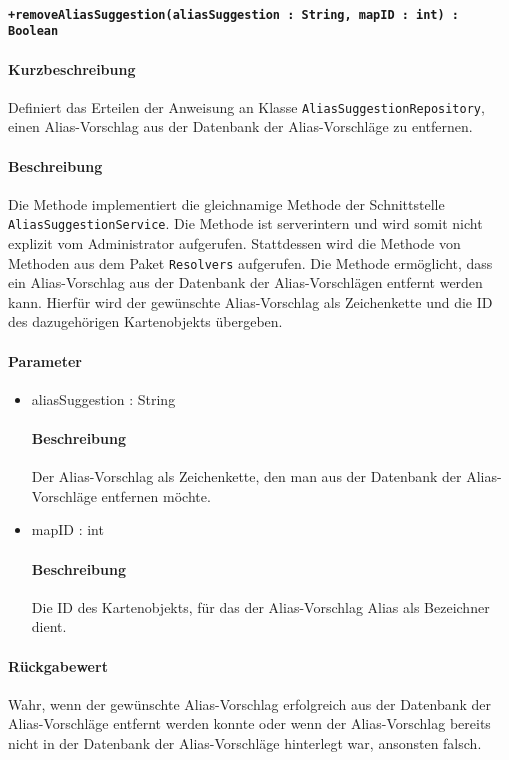 \paragraph*{\texttt{+removeAliasSuggestion(aliasSuggestion : String, mapID : int) : Boolean}}%
\paragraph*{Kurzbeschreibung}
Definiert das Erteilen der Anweisung an Klasse \texttt{AliasSuggestionRepository}, einen Alias-Vorschlag aus der Datenbank der Alias-Vorschläge zu entfernen.
\paragraph*{Beschreibung}
Die Methode implementiert die gleichnamige Methode der Schnittstelle \texttt{AliasSuggestionService}.
Die Methode ist serverintern und wird somit nicht explizit vom Administrator aufgerufen.
Stattdessen wird die Methode von Methoden aus dem Paket \texttt{Resolvers} aufgerufen.
Die Methode ermöglicht, dass ein Alias-Vorschlag aus der Datenbank der Alias-Vorschlägen entfernt werden kann.
Hierfür wird der gewünschte Alias-Vorschlag als Zeichenkette und die ID des dazugehörigen Kartenobjekts übergeben.
\paragraph*{Parameter}
\begin{itemize}
    \item aliasSuggestion : String
    		\paragraph*{Beschreibung}
    		Der Alias-Vorschlag als Zeichenkette, den man aus der Datenbank der Alias-Vorschläge entfernen möchte.
    \item mapID : int
    		\paragraph*{Beschreibung}
    		Die ID des Kartenobjekts, für das der Alias-Vorschlag Alias als Bezeichner dient.
\end{itemize}
\paragraph*{Rückgabewert}
Wahr, wenn der gewünschte Alias-Vorschlag erfolgreich aus der Datenbank der Alias-Vorschläge entfernt werden konnte oder wenn der Alias-Vorschlag bereits nicht in der Datenbank der Alias-Vorschläge hinterlegt war, ansonsten falsch.
